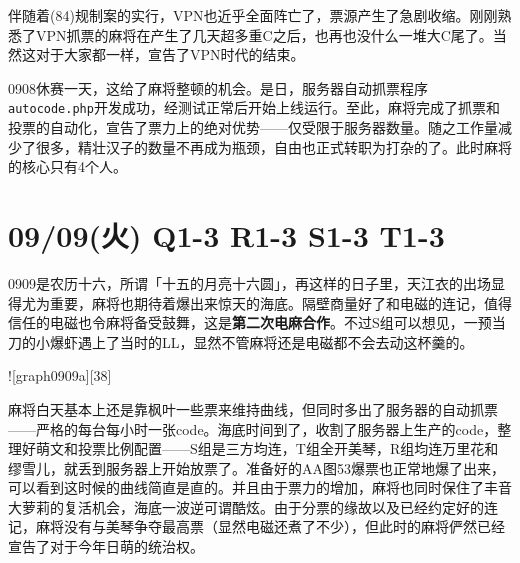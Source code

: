 伴随着(84)规制案的实行，VPN也近乎全面阵亡了，票源产生了急剧收缩。刚刚熟悉了VPN抓票的麻将在产生了几天超多重C之后，也再也没什么一堆大C尾了。当然这对于大家都一样，宣告了VPN时代的结束。

0908休赛一天，这给了麻将整顿的机会。是日，服务器自动抓票程序\verb=autocode.php=开发成功，经测试正常后开始上线运行。至此，麻将完成了抓票和投票的自动化，宣告了票力上的绝对优势——仅受限于服务器数量。随之工作量减少了很多，精壮汉子的数量不再成为瓶颈，自由也正式转职为打杂的了。此时麻将的核心只有4个人。

\section{09/09(火) Q1-3 R1-3 S1-3 T1-3}


0909是农历十六，所谓「十五的月亮十六圆」，再这样的日子里，天江衣的出场显得尤为重要，麻将也期待着爆出来惊天的海底。隔壁商量好了和电磁的连记，值得信任的电磁也令麻将备受鼓舞，这是\textbf{第二次电麻合作}。不过S组可以想见，一预当刀的小爆虾遇上了当时的LL，显然不管麻将还是电磁都不会去动这杯羹的。

![graph0909a][38]

麻将白天基本上还是靠枫叶一些票来维持曲线，但同时多出了服务器的自动抓票——严格的每台每小时一张code。海底时间到了，收割了服务器上生产的code，整理好萌文和投票比例配置——S组是三方均连，T组全开美琴，R组均连万里花和缪雪儿，就丢到服务器上开始放票了。准备好的AA图53爆票也正常地爆了出来，可以看到这时候的曲线简直是直的。并且由于票力的增加，麻将也同时保住了丰音大萝莉的复活机会，海底一波逆可谓酷炫。由于分票的缘故以及已经约定好的连记，麻将没有与美琴争夺最高票（显然电磁还煮了不少），但此时的麻将俨然已经宣告了对于今年日萌的统治权。

